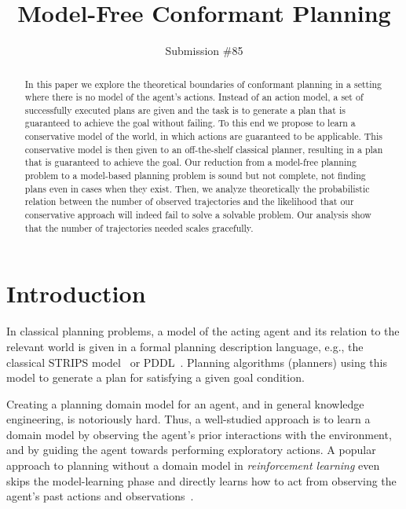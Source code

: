 \documentclass[letterpaper]{article}
\newcommand{\roni}[1]{[[Roni:#1]]}
\begin{document}
\title{Model-Free Conformant Planning}

\author{Submission \#85}

\maketitle

\begin{abstract}%
In this paper we explore the theoretical boundaries of 
conformant planning in a setting where 
there is no model of the agent's actions. 
Instead of an action model, a set of successfully executed plans are given and the task is to generate a plan that is guaranteed to achieve the goal without failing. 
To this end we propose to learn a conservative model of the world, in which actions are guaranteed to be applicable. This conservative model is then given to an off-the-shelf classical planner, resulting in a plan that is guaranteed to achieve the goal. 
Our reduction from a model-free planning problem to a model-based planning problem 
is sound but not complete, not finding plans even in cases when they exist. 
Then, we analyze theoretically the probabilistic relation between the number of observed trajectories and the likelihood that our conservative approach will indeed fail to solve a solvable problem. Our analysis show that the number of trajectories needed scales gracefully. 
\end{abstract}


\section{Introduction}
In classical planning problems, a model of the acting agent and its relation to the relevant world is given in a formal planning description language, e.g., the classical STRIPS model~\cite{fikes1971strips} or PDDL~\cite{mcdermott1998pddl}. Planning algorithms (planners) using this model to generate a plan for satisfying a given goal condition. 

Creating a planning domain model for an agent, and in general knowledge engineering, is notoriously hard. %
Thus, a well-studied approach is to learn a domain model by observing the agent's prior interactions with the environment, and by guiding the agent towards performing exploratory actions. A popular approach to planning without a domain model in {\em reinforcement learning} even skips the model-learning phase and directly learns how to act from observing the agent's past actions and observations~\cite[e.g.]{kearns2002}.  
\end{document}
